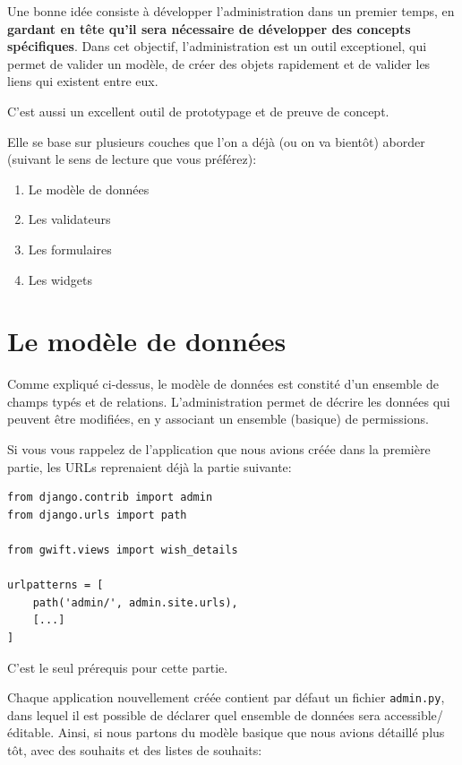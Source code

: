 \documentclass[11pt]{amsbook}
\begin{document}
Une bonne idée consiste à développer l’administration dans un premier temps, en \textbf{gardant en tête qu’il sera nécessaire de développer des concepts spécifiques}.
Dans cet objectif, l’administration est un outil exceptionel, qui permet de valider un modèle, de créer des objets rapidement et de valider les liens qui existent entre eux.


C’est aussi un excellent outil de prototypage et de preuve de concept.


Elle se base sur plusieurs couches que l’on a déjà (ou on va bientôt) aborder (suivant le sens de lecture que vous préférez):


\begin{enumerate}

\item{Le modèle de données}

\item{Les validateurs}

\item{Les formulaires}

\item{Les widgets}

\end{enumerate}


\hypertarget{x-le-modèle-de-données}{\section{Le modèle de données}}
Comme expliqué ci-dessus, le modèle de données est constité d’un ensemble de champs typés et de relations.
L’administration permet de décrire les données qui peuvent être modifiées, en y associant un ensemble (basique) de permissions.


Si vous vous rappelez de l’application que nous avions créée dans la première partie, les URLs reprenaient déjà la partie suivante:


\begin{verbatim}
from django.contrib import admin
from django.urls import path

from gwift.views import wish_details

urlpatterns = [
    path('admin/', admin.site.urls), 
    [...]
]
\end{verbatim}


C’est le seul prérequis pour cette partie.


Chaque application nouvellement créée contient par défaut un fichier \texttt{admin.py}, dans lequel il est possible de déclarer quel ensemble de données sera accessible/éditable.
Ainsi, si nous partons du modèle basique que nous avions détaillé plus tôt, avec des souhaits et des listes de souhaits:
\end{document}
